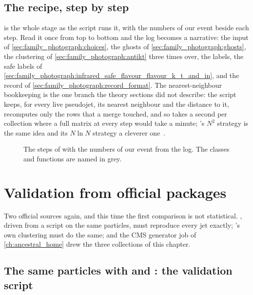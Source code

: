 \subsection{The recipe, step by step}
\label{sec:family_photograph:step_by_step}

 is the whole stage as the script runs
it, with the numbers of our event beside each step. Read it once from top
to bottom and the  log becomes a narrative: the input of
\cref{sec:family_photograph:choices}, the ghosts of
\cref{sec:family_photograph:ghosts}, the clustering of
\cref{sec:family_photograph:antikt} three times over, the labels, the
safe labels of
\cref{sec:family_photograph:infrared_safe_flavour_flavour_k_t_and_in}, and
the record of \cref{sec:family_photograph:record_format}. The
nearest-neighbour bookkeeping is the one branch the theory sections did
not describe: the script keeps, for every live pseudojet, its nearest
neighbour and the distance to it, recomputes only the rows that a merge
touched, and so takes a second per collection where a full matrix at
every step would take a minute; \FASTJET's $N^2$ strategy is the same
idea and its $N\ln N$ strategy a cleverer one~\cite{Cacciari:2011ma}.

\begin{figure}[htbp]\centering
\resizebox{\textwidth}{!}{}
\caption[The GenJet stage as a flow chart]{The steps of
 with the numbers of our event from the
 log. The classes and functions are named in grey.}
\label{fig:family_photograph:flow}
\end{figure}

\section{Validation from official packages}
\label{sec:family_photograph:validation}

Two official sources again, and this time the first comparison is not
statistical. \FASTJET, driven from a script on the same particles, must
reproduce every jet exactly; \PYTHIA's own clustering must do the same;
and the CMS generator job of \cref{ch:ancestral_home} drew the three
collections of this chapter.

\subsection{The same particles with \FASTJET and : the validation script}
\label{sec:family_photograph:fastjet}

